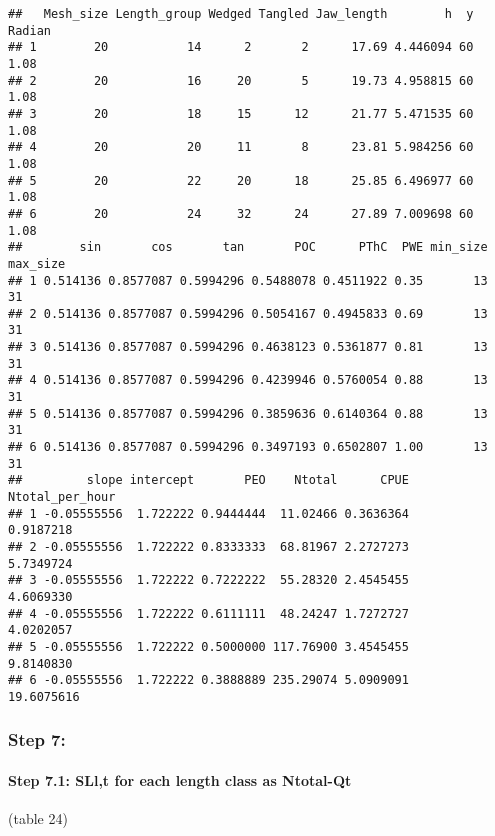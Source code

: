 \documentclass[]{article}
\newenvironment{Shaded}{\begin{snugshade}}{\end{snugshade}}
\newcommand{\KeywordTok}[1]{\textcolor[rgb]{0.13,0.29,0.53}{\textbf{#1}}}
\newcommand{\CommentTok}[1]{\textcolor[rgb]{0.56,0.35,0.01}{\textit{#1}}}
\newcommand{\OperatorTok}[1]{\textcolor[rgb]{0.81,0.36,0.00}{\textbf{#1}}}
\newcommand{\NormalTok}[1]{#1}
\let\oldparagraph\paragraph
\renewcommand{\paragraph}[1]{\oldparagraph{#1}\mbox{}}
\begin{document}
\begin{verbatim}
##   Mesh_size Length_group Wedged Tangled Jaw_length        h  y Radian
## 1        20           14      2       2      17.69 4.446094 60   1.08
## 2        20           16     20       5      19.73 4.958815 60   1.08
## 3        20           18     15      12      21.77 5.471535 60   1.08
## 4        20           20     11       8      23.81 5.984256 60   1.08
## 5        20           22     20      18      25.85 6.496977 60   1.08
## 6        20           24     32      24      27.89 7.009698 60   1.08
##        sin       cos       tan       POC      PThC  PWE min_size max_size
## 1 0.514136 0.8577087 0.5994296 0.5488078 0.4511922 0.35       13       31
## 2 0.514136 0.8577087 0.5994296 0.5054167 0.4945833 0.69       13       31
## 3 0.514136 0.8577087 0.5994296 0.4638123 0.5361877 0.81       13       31
## 4 0.514136 0.8577087 0.5994296 0.4239946 0.5760054 0.88       13       31
## 5 0.514136 0.8577087 0.5994296 0.3859636 0.6140364 0.88       13       31
## 6 0.514136 0.8577087 0.5994296 0.3497193 0.6502807 1.00       13       31
##         slope intercept       PEO    Ntotal      CPUE Ntotal_per_hour
## 1 -0.05555556  1.722222 0.9444444  11.02466 0.3636364       0.9187218
## 2 -0.05555556  1.722222 0.8333333  68.81967 2.2727273       5.7349724
## 3 -0.05555556  1.722222 0.7222222  55.28320 2.4545455       4.6069330
## 4 -0.05555556  1.722222 0.6111111  48.24247 1.7272727       4.0202057
## 5 -0.05555556  1.722222 0.5000000 117.76900 3.4545455       9.8140830
## 6 -0.05555556  1.722222 0.3888889 235.29074 5.0909091      19.6075616
\end{verbatim}

\subsubsection{Step 7:}\label{step-7}

\paragraph{Step 7.1: SLl,t for each length class as
Ntotal-Qt}\label{step-7.1-sllt-for-each-length-class-as-ntotal-qt}

(table 24)

\begin{Shaded}
\end{Shaded}
\end{document}
